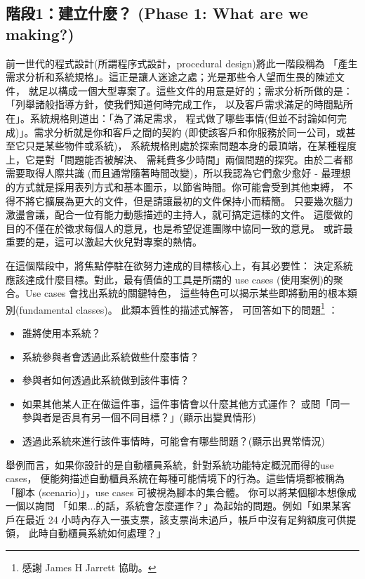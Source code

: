 \subsection{階段1：建立什麼？ (Phase 1: What are we making?)}
前一世代的程式設計(所謂程序式設計，procedural design)將此一階段稱為
「產生需求分析和系統規格」。這正是讓人迷途之處；光是那些令人望而生畏的陳述文件，
就足以構成一個大型專案了。這些文件的用意是好的；需求分析所做的是：
「列舉諸般指導方針，使我們知道何時完成工作，
以及客戶需求滿足的時間點所在」。系統規格則道出：「為了滿足需求，
程式做了哪些事情(但並不討論如何完成)」。需求分析就是你和客戶之間的契約
(即使該客戶和你服務於同一公司，或甚至它只是某些物件或系統)，
系統規格則處於探索問題本身的最頂端，在某種程度上，它是對「問題能否被解決、
需耗費多少時間」兩個問題的探究。由於二者都需要取得人際共識
(而且通常隨著時間改變)，所以我認為它們愈少愈好 -
最理想的方式就是採用表列方式和基本圖示，以節省時間。你可能會受到其他束縛，
不得不將它擴展為更大的文件，但是請讓最初的文件保持小而精簡。
只要幾次腦力激盪會議，配合一位有能力動態描述的主持人，就可搞定這樣的文件。
這麼做的目的不僅在於徵求每個人的意見，也是希望促進團隊中協同一致的意見。
或許最重要的是，這可以激起大伙兒對專案的熱情。

在這個階段中，將焦點停駐在欲努力達成的目標核心上，有其必要性：
決定系統應該達成什麼目標。對此，最有價值的工具是所謂的
use cases (使用案例)的聚合。Use cases 會找出系統的關鍵特色，
這些特色可以揭示某些即將動用的根本類別(fundamental classes)。
此類本質性的描述式解答，
可回答如下的問題\footnote{感謝 James H Jarrett 協助。} ：

\begin{itemize}
\item 誰將使用本系統？
\item 系統參與者會透過此系統做些什麼事情？
\item 參與者如何透過此系統做到該件事情？
\item 如果其他某人正在做這件事，這件事情會以什麼其他方式運作？
或問「同一參與者是否具有另一個不同目標？」(顯示出變異情形)
\item 透過此系統來進行該件事情時，可能會有哪些問題？(顯示出異常情況)
\end{itemize}

舉例而言，如果你設計的是自動櫃員系統，針對系統功能特定概況而得的use cases，
便能夠描述自動櫃員系統在每種可能情境下的行為。這些情境都被稱為「腳本
(scenario)」，use cases 可被視為腳本的集合體。
你可以將某個腳本想像成一個以詢問
「如果...的話，系統會怎麼運作？」為起始的問題。例如「如果某客戶在最近 24
小時內存入一張支票，該支票尚未過戶，帳戶中沒有足夠額度可供提領，
此時自動櫃員系統如何處理？」

